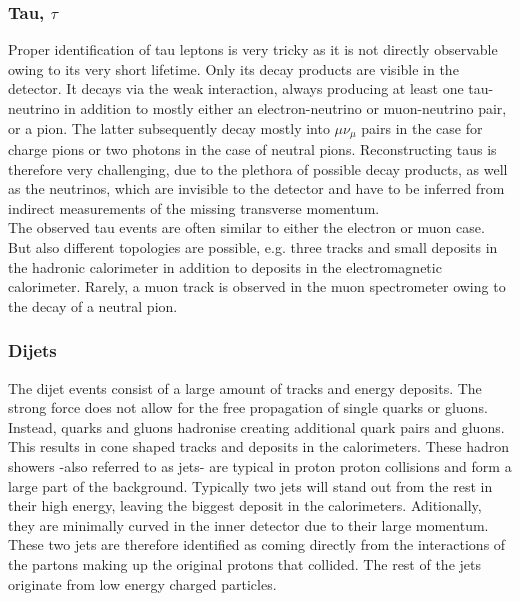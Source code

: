 \documentclass[twoside,        %
               BCOR12mm,       %
               ngerman,english, %
               fleqn,headsepline=false,footsepline=false
              ]{Vorlage/MFPREPORT}
\begin{document}
\subsubsection{Tau, $\tau$}
Proper identification of tau leptons is very tricky as it is not directly
observable owing to its very short lifetime. Only its decay products are
visible in the detector. It decays via the weak interaction, always producing
at least one tau-neutrino in addition to mostly either an electron-neutrino or
muon-neutrino pair, or a pion. The latter subsequently decay
mostly into $\mu\nu_\mu$ pairs in the case for charge pions or two photons in
the case of neutral pions.
Reconstructing taus is therefore very challenging, due to the plethora of
possible decay products, as well as the neutrinos, which are invisible to the
detector and have to be inferred from indirect measurements of the missing
transverse momentum.\\
The observed tau events are often similar to either the electron or muon case.
But also different topologies are possible, e.g. three tracks and small
deposits in the hadronic calorimeter in addition to deposits in the
electromagnetic calorimeter. Rarely, a muon track is observed in the muon
spectrometer owing to the decay of a neutral pion.

\subsubsection{Dijets}
The dijet events consist of a large amount of tracks and energy deposits.
The strong force does not allow for the free propagation of single quarks or
gluons. Instead, quarks and gluons hadronise creating additional quark pairs
and gluons. This results in cone shaped tracks and deposits in the
calorimeters. These hadron showers -also referred to as jets- are typical in
proton proton collisions and form a large part of the background. Typically two
jets will stand out from the rest in their high energy, leaving the biggest
deposit in the calorimeters. Aditionally, they are minimally
curved in the inner detector due to their large momentum. These two jets are
therefore identified as coming directly from the interactions of the partons
making up the original protons that collided. The rest of the jets originate
from low energy charged particles.
\end{document}
